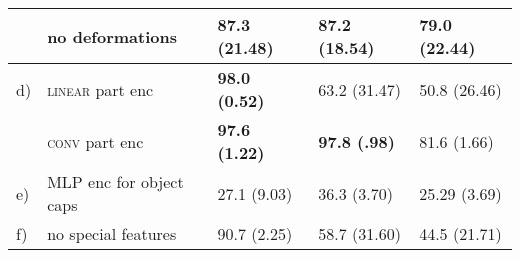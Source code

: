 \begin{table}
\begin{tabular}{@{}lllll@{}}
			&no deformations    & 87.3 (21.48) &    87.2    (18.54) &    79.0    (22.44)\\
			\midrule
			d)&\textsc{linear} part enc & \textbf{98.0 (0.52)} &    63.2 (31.47)    & 50.8 (26.46)\\
			&\textsc{conv} part enc &    \textbf{97.6 (1.22)} &    \textbf{97.8    (.98)} &    81.6    (1.66)\\
			\midrule
			e)& \gls{MLP} enc for object caps    & 27.1 (9.03) &    36.3    (3.70) &    25.29    (3.69)\\
			f)& no special features &    90.7 (2.25) &    58.7 (31.60) &    44.5 (21.71)\\
		\end{tabular}
\end{table}